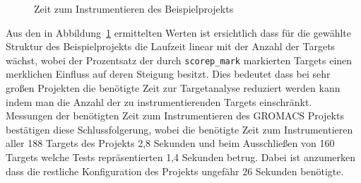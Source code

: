 \documentclass[german,proseminar,hyperref,utf8,lof]{zihpub}
\begin{document}
    \begin{figure}
        \begin{center}
            \caption{Zeit zum Instrumentieren des Beispielprojekts}
            \label{fig:runtime}
        \end{center}
    \end{figure}

    Aus den in Abbildung~\ref{fig:runtime} ermittelten Werten ist ersichtlich dass für die gewählte Struktur
    des Beispielprojekts die Laufzeit linear mit der Anzahl der Targets wächst, wobei der Prozentsatz der
    durch \texttt{scorep\_mark} markierten Targets einen merklichen Einfluss auf deren Steigung besitzt.
    Dies bedeutet dass bei sehr gro{\ss}en Projekten die benötigte Zeit zur Targetanalyse reduziert werden
    kann indem man die Anzahl der zu instrumentierenden Targets einschränkt.
    Messungen der benötigten Zeit zum Instrumentieren des GROMACS Projekts bestätigen diese Schlussfolgerung,
    wobei die benötigte Zeit zum Instrumentieren aller 188 Targets des Projekts 2,8 Sekunden und beim
    Ausschlie{\ss}en von 160 Targets welche Tests repräsentierten 1,4 Sekunden betrug.
    Dabei ist anzumerken dass die restliche Konfiguration des Projekts ungefähr 26 Sekunden benötigte.
\end{document}
